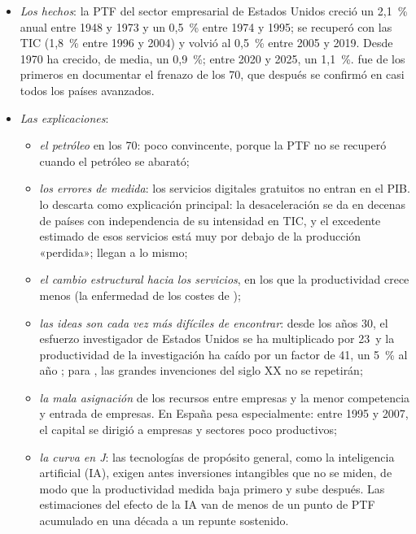 \documentclass[11pt]{article}
\begin{document}
\begin{itemize}
\item \emph{Los hechos}: la PTF del sector empresarial de Estados Unidos creció un 2,1~\% anual entre 1948 y 1973 y un 0,5~\% entre 1974 y 1995; se recuperó con las TIC (1,8~\% entre 1996 y 2004) y volvió al 0,5~\% entre 2005 y 2019. Desde 1970 ha crecido, de media, un 0,9~\%; entre 2020 y 2025, un 1,1~\%\nocite{FRBSF2026PTF}. \textcite{Denison1985} fue de los primeros en documentar el frenazo de los 70, que después se confirmó en casi todos los países avanzados.
\item \emph{Las explicaciones}:
  \begin{itemize}
  \item \emph{el petróleo} en los 70: poco convincente, porque la PTF no se recuperó cuando el petróleo se abarató;
  \item \emph{los errores de medida}: los servicios digitales gratuitos no entran en el PIB. \textcite{Syverson2017} lo descarta como explicación principal: la desaceleración se da en decenas de países con independencia de su intensidad en TIC, y el excedente estimado de esos servicios está muy por debajo de la producción «perdida»; \textcite{ByrneFernaldReinsdorf2016} llegan a lo mismo;
  \item \emph{el cambio estructural hacia los servicios}, en los que la productividad crece menos (la enfermedad de los costes de );
  \item \emph{las ideas son cada vez más difíciles de encontrar}: desde los años 30, el esfuerzo investigador de Estados Unidos se ha multiplicado por 23~y la productividad de la investigación ha caído por un factor de 41, un 5~\% al año\nocite{BloomEtAl2020} ; para \textcite{Gordon2016}, las grandes invenciones del siglo XX no se repetirán;
  \item \emph{la mala asignación} de los recursos entre empresas y la menor competencia y entrada de empresas. En España pesa especialmente: entre 1995 y 2007, el capital se dirigió a empresas y sectores poco productivos\nocite{GarciaSantanaEtAl2020};
  \item \emph{la curva en J}: las tecnologías de propósito general, como la inteligencia artificial (IA), exigen antes inversiones intangibles que no se miden, de modo que la productividad medida baja primero y sube después\nocite{BrynjolfssonRockSyverson2021}. Las estimaciones del efecto de la IA van de menos de un punto de PTF acumulado en una década\nocite{Acemoglu2025AI} a un repunte sostenido.

\end{itemize}
\end{itemize}
\end{document}
